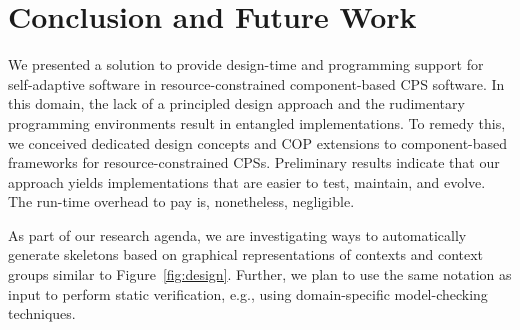 \section{Conclusion and Future Work}
\label{sec:ending}

We presented a solution to provide design-time and programming support
for self-adaptive software in re\-sour\-ce-constrained component-based
CPS software. In this domain, the lack of a principled design approach
and the rudimentary programming environments result in entangled
implementations. To remedy this, we conceived dedicated design
concepts and COP extensions to component-based frameworks for
resource-constrained CPSs. Preliminary results indicate that our
approach yields implementations that are easier to test, maintain, and
evolve. The run-time overhead to pay is, nonetheless, negligible.



As part of our research agenda, we are investigating ways to
automatically generate \conesc skeletons based on graphical
representations of contexts and context groups similar to
Figure~\ref{fig:design}. Further, we plan to use the same notation as
input to perform static verification, e.g., using domain-specific
model-checking techniques.

